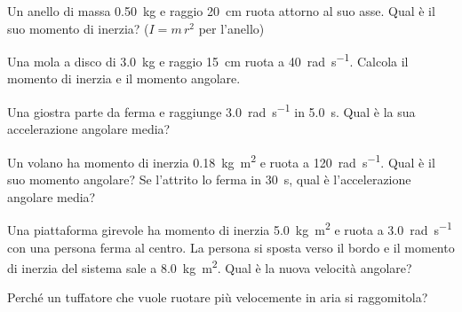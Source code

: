 \begin{esercizio}
Un anello di massa \SI{0,50}{\kilogram} e raggio \SI{20}{\centi\metre} ruota attorno al suo asse. Qual è il suo momento di inerzia? ($I = m\,r^2$ per l'anello)\\
\end{esercizio}

\begin{esercizio}
Una mola a disco di \SI{3,0}{\kilogram} e raggio \SI{15}{\centi\metre} ruota a \SI{40}{\radian\per\second}. Calcola il momento di inerzia e il momento angolare.\\
\end{esercizio}

\begin{esercizio}
Una giostra parte da ferma e raggiunge \SI{3,0}{\radian\per\second} in \SI{5,0}{\second}. Qual è la sua accelerazione angolare media?\\
\end{esercizio}

\begin{esercizio}
Un volano ha momento di inerzia \SI{0,18}{\kilogram\metre\squared} e ruota a \SI{120}{\radian\per\second}. Qual è il suo momento angolare? Se l'attrito lo ferma in \SI{30}{\second}, qual è l'accelerazione angolare media?\\
\end{esercizio}

\begin{esercizio}
Una piattaforma girevole ha momento di inerzia \SI{5,0}{\kilogram\metre\squared} e ruota a \SI{3,0}{\radian\per\second} con una persona ferma al centro. La persona si sposta verso il bordo e il momento di inerzia del sistema sale a \SI{8,0}{\kilogram\metre\squared}. Qual è la nuova velocità angolare?\\
\end{esercizio}

\begin{esercizio}
Perché un tuffatore che vuole ruotare più velocemente in aria si raggomitola?\\
\end{esercizio}

